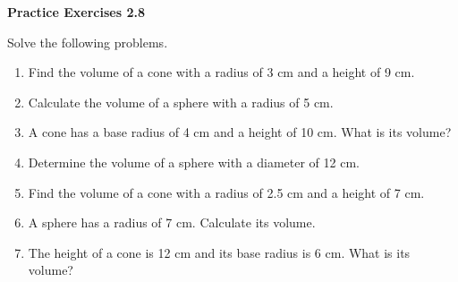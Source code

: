  \vspace{1ex}
\noindent\textbf{Practice Exercises 2.8}

\vspace{0.75ex}

Solve the following problems.
\begin{enumerate}[noitemsep, label = \color{blue}\arabic*. ]   
    \item Find the volume of a cone with a radius of 3 cm and a height of 9 cm.
    \item Calculate the volume of a sphere with a radius of 5 cm.
    \item A cone has a base radius of 4 cm and a height of 10 cm. What is its volume?
    \item Determine the volume of a sphere with a diameter of 12 cm.
    \item Find the volume of a cone with a radius of 2.5 cm and a height of 7 cm.
    \item A sphere has a radius of 7 cm. Calculate its volume.
    \item The height of a cone is 12 cm and its base radius is 6 cm. What is its volume?
\end{enumerate}
